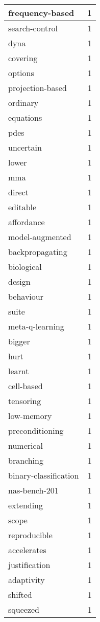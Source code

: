 \begin{table}[h]
\begin{tabular}{|l|r|}
\hline
frequency-based & 1 \\
\hline
search-control & 1 \\
\hline
dyna & 1 \\
\hline
covering & 1 \\
\hline
options & 1 \\
\hline
projection-based & 1 \\
\hline
ordinary & 1 \\
\hline
equations & 1 \\
\hline
pdes & 1 \\
\hline
uncertain & 1 \\
\hline
lower & 1 \\
\hline
mma & 1 \\
\hline
direct & 1 \\
\hline
editable & 1 \\
\hline
affordance & 1 \\
\hline
model-augmented & 1 \\
\hline
backpropagating & 1 \\
\hline
biological & 1 \\
\hline
design & 1 \\
\hline
behaviour & 1 \\
\hline
suite & 1 \\
\hline
meta-q-learning & 1 \\
\hline
bigger & 1 \\
\hline
hurt & 1 \\
\hline
learnt & 1 \\
\hline
cell-based & 1 \\
\hline
tensoring & 1 \\
\hline
low-memory & 1 \\
\hline
preconditioning & 1 \\
\hline
numerical & 1 \\
\hline
branching & 1 \\
\hline
binary-classification & 1 \\
\hline
nas-bench-201 & 1 \\
\hline
extending & 1 \\
\hline
scope & 1 \\
\hline
reproducible & 1 \\
\hline
accelerates & 1 \\
\hline
justification & 1 \\
\hline
adaptivity & 1 \\
\hline
shifted & 1 \\
\hline
squeezed & 1 \\

\end{tabular}
\end{table}
